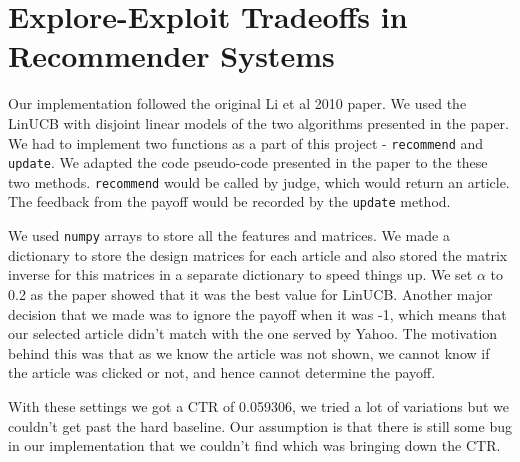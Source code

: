 \documentclass[a4paper, 11pt]{article}
\begin{document}
\section{Explore-Exploit Tradeoffs in Recommender Systems}

Our implementation followed the original Li et al 2010 paper. We used the LinUCB with disjoint linear models of the two algorithms presented in the paper.
We had to implement two functions as a part of this project - \lstinline{recommend} and \lstinline{update}. We adapted the code pseudo-code presented in the
paper to the these two methods. \lstinline{recommend} would be called by judge, which would return an article. The feedback from the payoff would be recorded
by the \lstinline{update} method.

We used \lstinline{numpy} arrays to store all the features and matrices. We made a dictionary to store the design matrices for each article and also stored
the matrix inverse for this matrices in a separate dictionary to speed things up. We set $\alpha$ to 0.2 as the paper showed that it was the best value for LinUCB.
Another major decision that we made was to ignore the payoff when it was -1, which means that our selected article didn't match with the one served by
Yahoo. The motivation behind this was that as we know the article was not shown, we cannot know if the article was clicked or not, and hence cannot determine
the payoff.

With these settings we got a CTR of 0.059306, we tried a lot of variations but we couldn't get past the hard baseline. Our assumption is that there is still
some bug in our implementation that we couldn't find which was bringing down the CTR.
\end{document}
